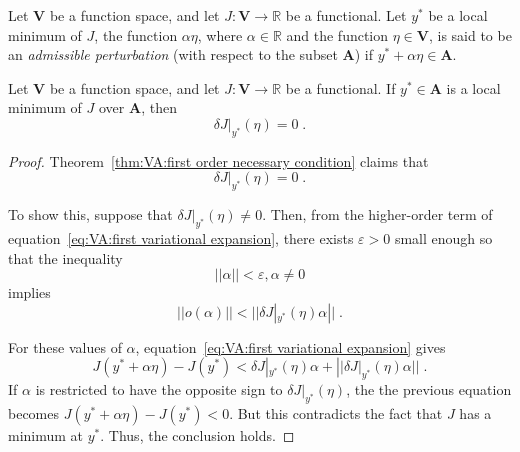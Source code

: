 \begin{definition}
	Let $\mathbf{V}$ be a function space, and let 
	$J:\mathbf{V}\to\mathbb{R}$ be a functional. Let $y^\ast$ be a local
	minimum of $J$, the function $\alpha\eta$, where $\alpha\in\mathbb{R}$
	and the function $\eta\in\mathbf{V}$, is said to be an 
	\emph{admissible perturbation} (with respect to the subset 
	$\mathbf{A}$) if $y^\ast+\alpha\eta\in\mathbf{A}$.
\end{definition}

\begin{theorem}\label{thm:VA:first order necessary condition}
	Let $\mathbf{V}$ be a function space, and let 
	$J:\mathbf{V}\to\mathbb{R}$ be a functional. If $y^\ast\in\mathbf{A}$
	is a local minimum of $J$ over $\mathbf{A}$, then
	\[\delta J|_{y^\ast}(\eta)=0\;.\]
\end{theorem}

\begin{proof}
	Theorem~\ref{thm:VA:first order necessary condition} claims that
	\[\delta J|_{y^\ast}(\eta)=0\;.\]

	To show this, suppose that $\delta J|_{y^\ast}(\eta)\neq0$. Then,
	from the higher-order term of equation~\eqref{eq:VA:first variational expansion},
	there exists $\varepsilon>0$ small enough so that the inequality
	\[||\alpha||<\varepsilon, \alpha\neq0\]
	implies
	\[||o(\alpha)||<||\delta J|_{y^\ast}(\eta)\alpha||\;.\]

	For these values of $\alpha$, equation~\eqref{eq:VA:first variational expansion}
	gives
	\begin{equation*}
		J(y^\ast+\alpha\eta)-J(y^\ast)<\delta J|_{y^\ast}(\eta)\alpha + 
		||\delta J|_{y^\ast}(\eta)\alpha||\;.
	\end{equation*}
	If $\alpha$ is restricted to have the opposite sign to 
	$\delta J|_{y^\ast}(\eta)$, the the previous equation becomes
	$J(y^\ast+\alpha\eta)-J(y^\ast)<0$. But this contradicts the fact
	that $J$ has a minimum at $y^\ast$. Thus, the conclusion holds.
\end{proof}